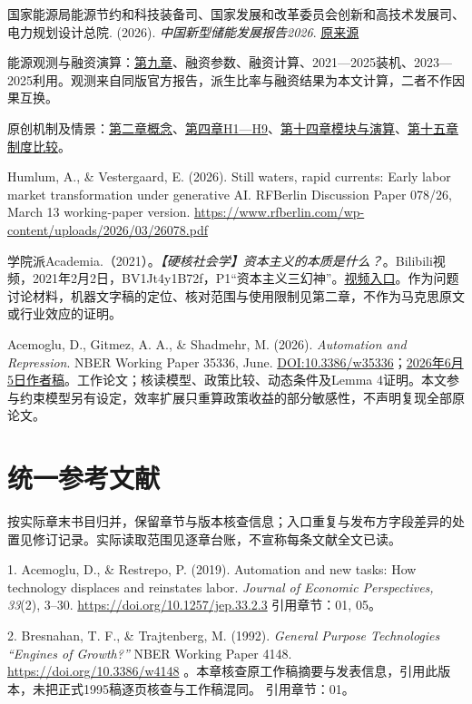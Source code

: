 \documentclass[UTF8,fontset=windows,12pt,a4paper,oneside,openany]{ctexbook}
\begin{document}
国家能源局能源节约和科技装备司、国家发展和改革委员会创新和高技术发展司、电力规划设计总院. (2026). \emph{中国新型储能发展报告2026}. \href{https://www.nea.gov.cn/20260730/0a1e9823b7a14e8ba16e82c34b3bea2b/c.html}{原来源}

能源观测与融资演算：\hyperref[ch:9]{第九章}、融资参数、融资计算、2021—2025装机、2023—2025利用。观测来自同版官方报告，派生比率与融资结果为本文计算，二者不作因果互换。

原创机制及情景：\hyperref[ch:2]{第二章概念}、\hyperref[ch:4]{第四章H1—H9}、\hyperref[ch:14]{第十四章模块与演算}、\hyperref[ch:15]{第十五章制度比较}。

Humlum, A., \& Vestergaard, E. (2026). Still waters, rapid currents: Early labor market transformation under generative AI. RFBerlin Discussion Paper 078/26, March 13 working-paper version. \url{https://www.rfberlin.com/wp-content/uploads/2026/03/26078.pdf}

学院派Academia.（2021）。\emph{【硬核社会学】资本主义的本质是什么？}。Bilibili视频，2021年2月2日，BV1Jt4y1B72f，P1“资本主义三幻神”。\href{https://www.bilibili.com/video/BV1Jt4y1B72f/}{视频入口}。作为问题讨论材料，机器文字稿的定位、核对范围与使用限制见第二章，不作为马克思原文或行业效应的证明。

Acemoglu, D., Gitmez, A. A., \& Shadmehr, M. (2026). \emph{Automation and Repression}. NBER Working Paper 35336, June. \href{https://doi.org/10.3386/w35336}{DOI:10.3386/w35336}；\href{https://economics.mit.edu/sites/default/files/2026-06/Automation\%20and\%20Repression.pdf}{2026年6月5日作者稿}。工作论文；核读模型、政策比较、动态条件及Lemma 4证明。本文参与约束模型另有设定，效率扩展只重算政策收益的部分敏感性，不声明复现全部原论文。

\backmatter\chapter*{统一参考文献}


按实际章末书目归并，保留章节与版本核查信息；入口重复与发布方字段差异的处置见修订记录。实际读取范围见逐章台账，不宣称每条文献全文已读。

1. Acemoglu, D., \& Restrepo, P. (2019). Automation and new tasks: How technology displaces and reinstates labor. \emph{Journal of Economic Perspectives, 33}(2), 3–30. \url{https://doi.org/10.1257/jep.33.2.3}
引用章节：01, 05。

2. Bresnahan, T. F., \& Trajtenberg, M. (1992). \emph{General Purpose Technologies “Engines of Growth?”} NBER Working Paper 4148. \url{https://doi.org/10.3386/w4148} 。本章核查原工作稿摘要与发表信息，引用此版本，未把正式1995稿逐页核查与工作稿混同。
引用章节：01。
\end{document}
